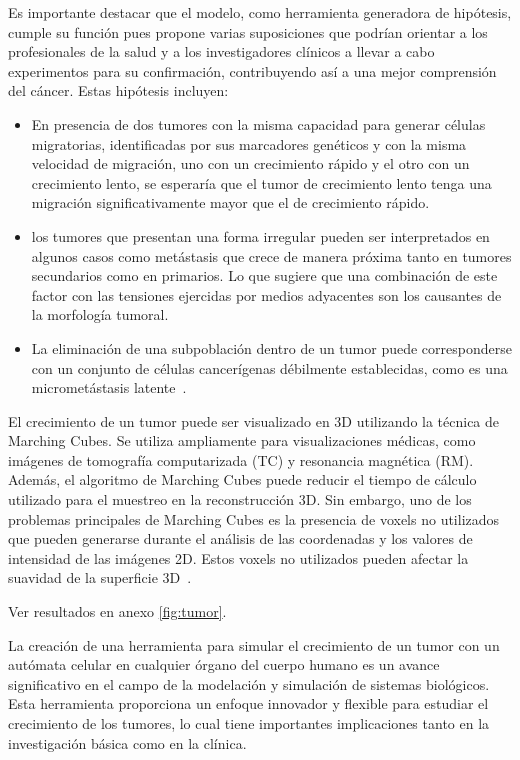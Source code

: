 \begin{conclusions}
Es importante destacar que el modelo, como herramienta generadora de hipótesis, cumple su función pues propone varias suposiciones que podrían orientar a los profesionales de la salud y a los investigadores clínicos a llevar a cabo experimentos para su confirmación, contribuyendo así a una mejor comprensión del cáncer. Estas hipótesis incluyen:

\begin{itemize}
    \item En presencia de dos tumores con la misma capacidad para generar células migratorias, identificadas por sus marcadores genéticos y con la misma velocidad de migración, uno con un crecimiento rápido y el otro con un crecimiento lento, se esperaría que el tumor de crecimiento lento tenga una migración significativamente mayor que el de crecimiento rápido.
    \item los tumores que presentan una forma irregular pueden ser interpretados en algunos casos como metástasis que crece de manera próxima tanto en tumores secundarios como en primarios. Lo que sugiere que una combinación de este factor con las tensiones ejercidas por medios adyacentes son los causantes de la morfología tumoral.
    \item La eliminación de una subpoblación dentro de un tumor puede corresponderse con un conjunto de células cancerígenas débilmente establecidas, como es una micrometástasis latente~\cite{robins}.
\end{itemize}

El crecimiento de un tumor puede ser visualizado en 3D utilizando la técnica de Marching Cubes. Se utiliza ampliamente para visualizaciones médicas, como imágenes de tomografía computarizada (TC) y resonancia magnética (RM). Además, el algoritmo de Marching Cubes puede reducir el tiempo de cálculo utilizado para el muestreo en la reconstrucción 3D. Sin embargo, uno de los problemas principales de Marching Cubes es la presencia de voxels no utilizados que pueden generarse durante el análisis de las coordenadas y los valores de intensidad de las imágenes 2D. Estos voxels no utilizados pueden afectar la suavidad de la superficie 3D~\cite{visutsak2020}.

Ver resultados en anexo \ref{fig:tumor}.

La creación de una herramienta para simular el crecimiento de un tumor con un autómata celular en cualquier órgano del cuerpo humano es un avance significativo en el campo de la modelación y simulación de sistemas biológicos. Esta herramienta proporciona un enfoque innovador y flexible para estudiar el crecimiento de los tumores, lo cual tiene importantes implicaciones tanto en la investigación básica como en la clínica.


\end{conclusions}
